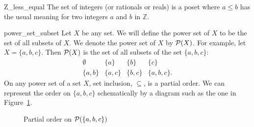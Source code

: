 \begin{example}{Z_less_equal}
The set of integers (or rationals  or reals) is a poset where $a \leq  b$ has the usual meaning for two integers $a$ and $b$ in ${\mathbb Z}$.
\end{example}


\begin{example}{power_set_subset}
Let $X$ be any set.  We will define the {\bfi power set\/} of $X$ to be the set of all subsets of $X$. We denote the power set of $X$ by ${\cal P}(X)$. For example, let $X = \{ a, b, c \}$.  Then ${\cal P}(X)$ is  the set of all subsets of the set  $\{ a, b, c \}$: 
\[
\begin{array}{cccc}
\emptyset & \{ a \} & \{ b \} & \{ c \} \\
\{ a, b \} & \{ a, c\} &\{ b, c\} & \{ a, b, c \}.
\end{array}
\]
On any power set of a set $X$, set inclusion, $\subseteq$, is a partial order.  We can represent the order on $\{ a, b, c \}$ schematically by a diagram such as the one in  Figure~\ref{partial}. 
\end{example}

\begin{figure}[htb]
\begin{center}
\end{center}
\caption{Partial order on ${\cal P}( \{ a, b, c \})$}
\label{partial}
\end{figure}

